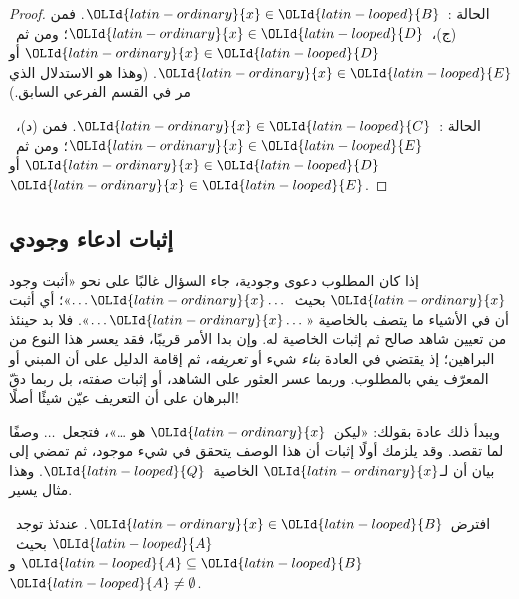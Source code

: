 \documentclass[../../../include/open-logic-section]{subfiles}
\begin{document}
\begin{proof}
  الحالة :~${\OLId{latin-ordinary}{x}} \in {\OLId{latin-looped}{B}}$. فمن (ج)،~${\OLId{latin-ordinary}{x}} \in {\OLId{latin-looped}{D}}$؛ ومن ثم~${\OLId{latin-ordinary}{x}} \in {\OLId{latin-looped}{D}}$ أو
  ${\OLId{latin-ordinary}{x}} \in {\OLId{latin-looped}{E}}$. (وهذا هو الاستدلال الذي مر في القسم الفرعي السابق.)

  الحالة :~${\OLId{latin-ordinary}{x}} \in {\OLId{latin-looped}{C}}$. فمن (د)،~${\OLId{latin-ordinary}{x}} \in {\OLId{latin-looped}{E}}$؛ ومن ثم~${\OLId{latin-ordinary}{x}} \in {\OLId{latin-looped}{D}}$ أو
  ${\OLId{latin-ordinary}{x}} \in {\OLId{latin-looped}{E}}$.
 \end{proof}


\subsection{إثبات ادعاء وجودي}

إذا كان المطلوب دعوى وجودية، جاء السؤال غالبًا على نحو «أثبت وجود
${\OLId{latin-ordinary}{x}}$ بحيث~$\dots {\OLId{latin-ordinary}{x}} \dots$»؛ أي أثبت أن في الأشياء ما يتصف بالخاصية
«$\dots {\OLId{latin-ordinary}{x}} \dots$». فلا بد حينئذ من تعيين شاهد صالح ثم إثبات الخاصية
له. وإن بدا الأمر قريبًا، فقد يعسر هذا النوع من البراهين؛ إذ يقتضي
في العادة \emph{بناء} شيء أو \emph{تعريفه}، ثم إقامة الدليل على أن
المبني أو المعرّف يفي بالمطلوب. وربما عسر العثور على الشاهد، أو إثبات
صفته، بل ربما دقّ البرهان على أن التعريف عيّن شيئًا أصلًا!{}

ويبدأ ذلك عادة بقولك: «ليكن~${\OLId{latin-ordinary}{x}}$ هو \dots»، فتجعل~$\dots$ وصفًا لما
تقصد. وقد يلزمك أولًا إثبات أن هذا الوصف يتحقق في شيء موجود، ثم تمضي
إلى بيان أن لـ${\OLId{latin-ordinary}{x}}$ الخاصية~${\OLId{latin-looped}{Q}}$. وهذا مثال يسير.

\begin{prop}
  افترض~${\OLId{latin-ordinary}{x}} \in {\OLId{latin-looped}{B}}$. عندئذ توجد~${\OLId{latin-looped}{A}}$ بحيث~${\OLId{latin-looped}{A}} \subseteq {\OLId{latin-looped}{B}}$ و
  ${\OLId{latin-looped}{A}} \neq \emptyset$.
\end{prop}
\end{document}
